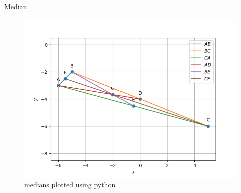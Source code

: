 \begin{table}[H]
        \centering
        
        \caption{Median.}
        \label{tab:Median}
    \end{table}
\begin{figure}[H]
\includegraphics[width=\columnwidth]{1.2/figs/12.png}
\caption{medians plotted using python}
\label{fig:i_median_py}
\end{figure}
